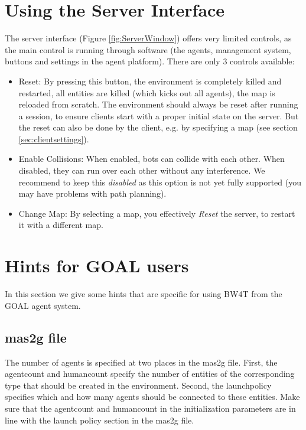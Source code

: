 \documentclass[11pt,a4paper]{article}
\begin{document}
\section{Using the Server Interface}
The server interface (Figure \ref{fig:ServerWindow}) offers very limited controls, as the main control is running through software (the agents, management system, buttons and settings in the agent platform). There are only 3 controls available:
\begin{itemize}
\item{Reset}: By pressing this button, the environment is completely killed and restarted, all entities are killed (which kicks out all agents), the map is reloaded from scratch. The environment should always be reset after running a session, to ensure clients start with a proper initial state on the server. But the reset can also be done by the client, e.g. by specifying a map (see section \ref{sec:clientsettings}).
\item{Enable Collisions}: When enabled, bots can collide with each other. When disabled, they can run over each other without any interference. We recommend to keep this \emph{disabled} as this option is not yet fully supported (you may have problems with path planning).
\item{Change Map}: By selecting a map, you effectively \emph{Reset} the server, to restart it with a different map.
\end{itemize}








\section{Hints for GOAL users}
In this section we give some hints that are specific for using BW4T from the GOAL agent system.

\subsection{mas2g file}
The number of agents is specified at two places in the mas2g file. First, the agentcount and humancount specify the number of entities of the corresponding type that should be created in the environment. Second, the launchpolicy specifies which and how many agents should be connected to these entities. Make sure that the agentcount and humancount in the initialization parameters are in line with the launch policy section in the mas2g file. 
\end{document}
